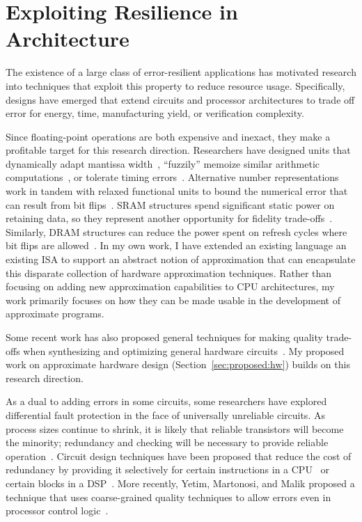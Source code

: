 \section{Exploiting Resilience in Architecture}

The existence of a large class of error-resilient applications has motivated
research into techniques that exploit this property to reduce resource usage.
Specifically, designs have emerged that extend circuits and processor
architectures to trade off error for energy, time, manufacturing yield, or
verification complexity.

Since floating-point operations are both expensive and inexact, they make a
profitable target for this research direction. Researchers have designed units
that dynamically adapt mantissa width~\cite{bitwidthred}, ``fuzzily'' memoize
similar arithmetic computations~\cite{fuzzymemo}, or tolerate timing
errors~\cite{palem-adders, impact, kumarhpca, hizli, adder-metrics}. Alternative number
representations work in tandem with relaxed functional units to bound the
numerical error that can result from bit flips~\cite{stanleymarbell}. SRAM
structures spend significant static power on retaining data, so they represent
another opportunity for fidelity trade-offs~\cite{hybrid-sram}. Similarly,
DRAM structures can reduce the power spent on refresh cycles where bit flips
are allowed~\cite{flikker}.
In my own work, I have extended an existing language an existing ISA to
support an abstract notion of approximation that can encapsulate this
disparate collection of hardware approximation techniques. Rather than
focusing on adding new approximation capabilities to CPU architectures, my
work primarily focuses on how they can be made usable in the development of
approximate programs.

Some recent work has also proposed general techniques for making quality trade-offs
when synthesizing and optimizing general hardware
circuits~\cite{lossysynthesis, palem-pruning}. My proposed work on approximate
hardware design (Section~\ref{sec:proposed:hw}) builds on this research direction.

As a dual to adding errors in some circuits, some researchers have
explored differential fault protection in the face of universally unreliable
circuits. As process sizes continue to shrink, it is likely that reliable
transistors will become the minority; redundancy and checking will be
necessary to provide reliable operation~\cite{li-asplos08}. Circuit design
techniques have been proposed that reduce the cost of redundancy by providing
it selectively for certain instructions in a CPU~\cite{wreft} or certain
blocks in a DSP~\cite{unequal-protection, ant}. More recently, Yetim, Martonosi,
and Malik proposed a technique that uses coarse-grained quality techniques to
allow errors even in processor control logic~\cite{martonosi-date}.


